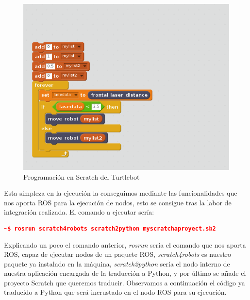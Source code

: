\begin{figure}[H]
    \centering
    \includegraphics[scale=0.60]{img/robot-obstaculos-scratch.PNG}
  	\caption{Programación en Scratch del Turtlebot}
  	\label{fig:turtlebot}
\end{figure}
\pagebreak
Esta simpleza en la ejecución la conseguimos mediante las funcionalidades que nos aporta ROS para la ejecución de nodos, esto se consigue tras la labor de integración realizada. El comando a ejecutar sería:

\begin{lstlisting}[language=json,firstnumber=1]
~$ rosrun scratch4robots scratch2python myscratchaproyect.sb2
\end{lstlisting}


Explicando un poco el comando anterior, \textit{rosrun} sería el comando que nos aporta ROS, capaz de ejecutar nodos de un paquete ROS, \textit{scratch4robots} es nuestro paquete ya instalado en la máquina, \textit{scratch2python} sería el nodo interno de nuestra aplicación encargada de la traducción a Python, y por último se añade el proyecto Scratch que queremos traducir. Observamos a continuación el código ya traducido a Python que será incrustado en el nodo ROS para su ejecución.

